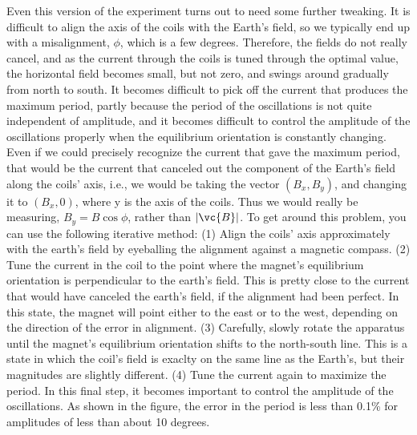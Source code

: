 Even this version of the experiment turns out to need some further tweaking. It is difficult
to align the axis of the coils with the Earth's field, so we typically end up with a misalignment,
$\phi$, which is a few degrees. Therefore, the fields do not really cancel, and as the current through the coils
is tuned through the optimal value, the horizontal field becomes small, but not zero, and
swings around gradually from north to south. It becomes difficult to pick off the current that produces the
maximum period, partly because the period of the oscillations is not quite independent of
amplitude, and it becomes difficult to control the amplitude of the oscillations properly
when the equilibrium orientation is constantly changing. Even if we could precisely recognize
the current that gave the maximum period, that would be the current that canceled out the
component of the Earth's field along the coils' axis, i.e., we would be taking the vector $(B_x,B_y)$,
and changing it to $(B_x,0)$, where y is the axis of the coils. Thus we would really be measuring,
$B_y=B\cos\phi$, rather than $|\vc{B}|$. To get around this problem, you can use the following iterative
method: (1) Align the coils' axis approximately with the earth's field by eyeballing the alignment against
a magnetic compass. (2) Tune the current in the coil to the point where the magnet's equilibrium orientation
is perpendicular to the earth's field. This is pretty close to the current that would have canceled the
earth's field, if the alignment had been perfect. In this state, the magnet will point either to the east
or to the west, depending on the direction of the error in alignment. (3) Carefully, slowly rotate
the apparatus until the magnet's equilibrium orientation shifts to the north-south line. This is a state
in which the coil's field is exaclty on the same line as the Earth's, but their magnitudes are slightly
different. (4) Tune the current again to maximize the period.
In this final step, it becomes important to control the amplitude of the oscillations.
As shown in the figure, the error in the period is less than 0.1\% for amplitudes of less than about
10 degrees.


